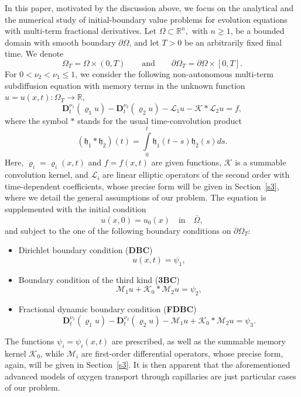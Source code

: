 \documentclass[reqno]{amsart}
\def\R {\mathbb{R}}
\theoremstyle{definition}
\numberwithin{equation}{section}
\begin{document}
In this paper, motivated by the discussion above, we focus on the analytical and
the numerical study of initial-boundary value problems for evolution equations with multi-term fractional derivatives.
Let $\Omega\subset\R^{n},$ with $n\geq 1$, be a bounded domain with smooth boundary $\partial\Omega$, and
let $T>0$ be an arbitrarily fixed final time. We denote
\[
\Omega_{T}=\Omega\times(0,T)\qquad\text{and}\qquad\partial\Omega_T=\partial\Omega\times[0,T].
\]
For $0<\nu_2<\nu_1\leq 1$, we consider the following non-autonomous multi-term subdiffusion equation with memory terms in the unknown function $u=u(x,t):\Omega_{T}\to\R,$
\begin{equation}\label{1.1}
\mathbf{D}_{t}^{\nu_1}(\varrho_1 u)-\mathbf{D}_{t}^{\nu_2}(\varrho_2 u)-\mathcal{L}_{1}u-\mathcal{K}*\mathcal{L}_{2}u=f,
\end{equation}
where the symbol $*$ stands for the usual time-convolution product
\[
(\mathfrak{h}_{1}*\mathfrak{h}_{2})(t)=\int\limits_{0}^{t} \mathfrak{h}_{1}(t-s)\mathfrak{h}_{2}(s)ds.
\]
Here, $\varrho_i=\varrho_i(x,t)$ and $f=f(x,t)$ are given functions, $\mathcal{K}$
is a summable convolution kernel, and
$\mathcal{L}_{i}$ are linear elliptic operators of the second order with time-dependent coefficients,
whose precise form will be given in Section~\ref{s3}, where we detail the general assumptions of our problem.
The equation is supplemented with the initial condition
\begin{equation}\label{1.2}
u(x,0)=u_{0}(x)\quad\text{in}\quad \bar{\Omega},
\end{equation}
and subject to the one of the following boundary conditions on $\partial\Omega_{T}$:
\smallskip
\begin{itemize}
\item[(i)] Dirichlet boundary condition (\textbf{DBC})
\begin{equation}\label{1.3}
u(x,t)=\psi_{1},
\end{equation}
\item[(ii)] Boundary condition of the third kind (\textbf{3BC})
\begin{equation}\label{1.4}
\mathcal{M}_1 u+\mathcal{K}_{0}*\mathcal{M}_{2}u=\psi_{2},
\end{equation}
\item[(iii)] Fractional dynamic  boundary condition  (\textbf{FDBC})
\begin{equation}\label{1.5}
\mathbf{D}_{t}^{\nu_1}(\varrho_1 u)-\mathbf{D}_{t}^{\nu_2}(\varrho_2 u)
-\mathcal{M}_1 u+\mathcal{K}_{0}*\mathcal{M}_{2}u=\psi_{3}.
\end{equation}
\end{itemize}
The functions $\psi_i=\psi_i(x,t)$ are prescribed, as well as the summable memory kernel $\mathcal{K}_0$,
while $\mathcal{M}_i$ are first-order differential operators, whose precise form, again,
will be given in Section~\ref{s3}. It is then apparent that
the aforementioned advanced models of oxygen transport through capillaries are
just particular cases of our problem.
\end{document}
